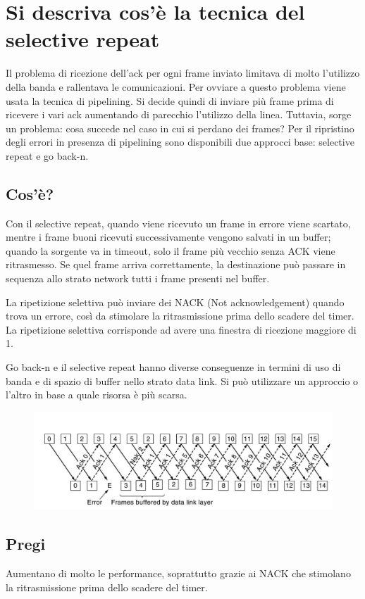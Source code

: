 \section{Si descriva cos'è la tecnica del selective repeat}

Il problema di ricezione dell’ack per ogni frame inviato limitava di molto l’utilizzo della banda e rallentava le comunicazioni.
Per ovviare a questo problema viene usata la tecnica di pipelining.
Si decide quindi di inviare più frame prima di ricevere i vari ack aumentando di parecchio l’utilizzo della linea.
Tuttavia, sorge un problema: cosa succede nel caso in cui si perdano dei frames?
Per il ripristino degli errori in presenza di pipelining sono disponibili due approcci base: selective repeat e go back-n.
\subsection{Cos'è?}
Con il selective repeat, quando viene ricevuto un frame in errore viene scartato, mentre i frame buoni ricevuti successivamente vengono salvati in un buffer;
quando la sorgente va in timeout, solo il frame più vecchio senza ACK viene ritrasmesso.
Se quel frame arriva correttamente, la destinazione può passare in sequenza allo strato network tutti i frame presenti nel buffer.

La ripetizione selettiva può inviare dei NACK (Not acknowledgement) quando trova un errore, così da stimolare la ritrasmissione prima dello scadere del timer.
La ripetizione selettiva corrisponde ad avere una finestra di ricezione maggiore di 1.

Go back-n e il selective repeat hanno diverse conseguenze in termini di uso di banda e di spazio di buffer nello strato data link.
Si può utilizzare un approccio o l'altro in base a quale risorsa è più scarsa.

\begin{figure}[H]
\centering
\includegraphics[scale=0.8]{res/img/21_SelectiveRepeat.png}
\end{figure}
 
\subsection{Pregi}
Aumentano di molto le performance, soprattutto grazie ai NACK che stimolano la ritrasmissione prima dello scadere del timer.

